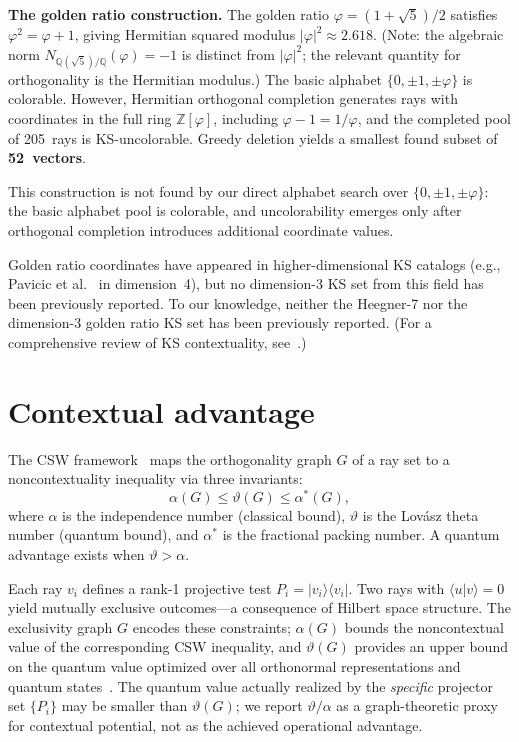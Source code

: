 \documentclass[twocolumn,prl,superscriptaddress,nofootinbib]{revtex4-2}
\newcommand{\Z}{\mathbb{Z}}
\newcommand{\Q}{\mathbb{Q}}
\begin{document}
\textbf{The golden ratio construction.} The golden ratio $\varphi = (1{+}\sqrt{5})/2$ satisfies $\varphi^2 = \varphi + 1$, giving Hermitian squared modulus $|\varphi|^2 \approx 2.618$. (Note: the algebraic norm $N_{\Q(\sqrt{5})/\Q}(\varphi) = -1$ is distinct from $|\varphi|^2$; the relevant quantity for orthogonality is the Hermitian modulus.) The basic alphabet $\{0, \pm 1, \pm\varphi\}$ is colorable. However, Hermitian orthogonal completion generates rays with coordinates in the full ring $\Z[\varphi]$, including $\varphi - 1 = 1/\varphi$, and the completed pool of 205~rays is KS-uncolorable. Greedy deletion yields a smallest found subset of \textbf{52~vectors}.

This construction is not found by our direct alphabet search over $\{0, \pm 1, \pm\varphi\}$: the basic alphabet pool is colorable, and uncolorability emerges only after orthogonal completion introduces additional coordinate values.

Golden ratio coordinates have appeared in higher-dimensional KS catalogs (e.g., Pavicic et al.~\cite{Pavicic2019} in dimension~4), but no dimension-3 KS set from this field has been previously reported.  To our knowledge, neither the Heegner-7 nor the dimension-3 golden ratio KS set has been previously reported.  (For a comprehensive review of KS contextuality, see~\cite{Budroni2022}.)

\section{Contextual advantage}

The CSW framework~\cite{CSW2014} maps the orthogonality graph $G$ of a ray set to a noncontextuality inequality via three invariants:
\[
\alpha(G) \leq \vartheta(G) \leq \alpha^*(G),
\]
where $\alpha$ is the independence number (classical bound), $\vartheta$ is the Lov\'asz theta number (quantum bound), and $\alpha^*$ is the fractional packing number. A quantum advantage exists when $\vartheta > \alpha$.

Each ray $v_i$ defines a rank-1 projective test $P_i = |v_i\rangle\langle v_i|$. Two rays with $\langle u | v \rangle = 0$ yield mutually exclusive outcomes---a consequence of Hilbert space structure. The exclusivity graph $G$ encodes these constraints; $\alpha(G)$ bounds the noncontextual value of the corresponding CSW inequality, and $\vartheta(G)$ provides an upper bound on the quantum value optimized over all orthonormal representations and quantum states~\cite{CSW2014}. The quantum value actually realized by the \emph{specific} projector set $\{P_i\}$ may be smaller than $\vartheta(G)$; we report $\vartheta/\alpha$ as a graph-theoretic proxy for contextual potential, not as the achieved operational advantage.
\end{document}
